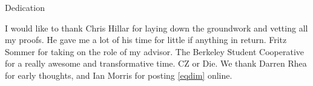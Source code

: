\documentclass{ucbthesis}
\begin{document}
\begin{frontmatter}

\begin{dedication}
\null\vfil
Dedication
\vspace{12pt}
\vfil\null
\end{dedication}


\tableofcontents
\clearpage
\listoffigures
\clearpage

\begin{acknowledgements}
I would like to thank Chris Hillar for laying down the groundwork and vetting all my proofs. He gave me a lot of his time for little if anything in return. Fritz Sommer for taking on the role of my advisor. The Berkeley Student Cooperative for a really awesome and transformative time. CZ or Die. 
We thank Darren Rhea for early thoughts, and Ian Morris for posting \eqref{eqdim} online.

\end{acknowledgements}

\end{frontmatter}
\end{document}
